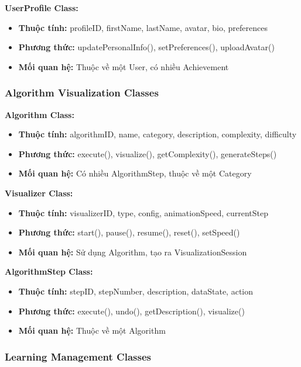 \textbf{UserProfile Class:}
\begin{itemize}
    \item \textbf{Thuộc tính:} profileID, firstName, lastName, avatar, bio, preferences
    \item \textbf{Phương thức:} updatePersonalInfo(), setPreferences(), uploadAvatar()
    \item \textbf{Mối quan hệ:} Thuộc về một User, có nhiều Achievement
\end{itemize}

\subsubsection{Algorithm Visualization Classes}

\textbf{Algorithm Class:}
\begin{itemize}
    \item \textbf{Thuộc tính:} algorithmID, name, category, description, complexity, difficulty
    \item \textbf{Phương thức:} execute(), visualize(), getComplexity(), generateSteps()
    \item \textbf{Mối quan hệ:} Có nhiều AlgorithmStep, thuộc về một Category
\end{itemize}

\textbf{Visualizer Class:}
\begin{itemize}
    \item \textbf{Thuộc tính:} visualizerID, type, config, animationSpeed, currentStep
    \item \textbf{Phương thức:} start(), pause(), resume(), reset(), setSpeed()
    \item \textbf{Mối quan hệ:} Sử dụng Algorithm, tạo ra VisualizationSession
\end{itemize}

\textbf{AlgorithmStep Class:}
\begin{itemize}
    \item \textbf{Thuộc tính:} stepID, stepNumber, description, dataState, action
    \item \textbf{Phương thức:} execute(), undo(), getDescription(), visualize()
    \item \textbf{Mối quan hệ:} Thuộc về một Algorithm
\end{itemize}

\subsubsection{Learning Management Classes}

